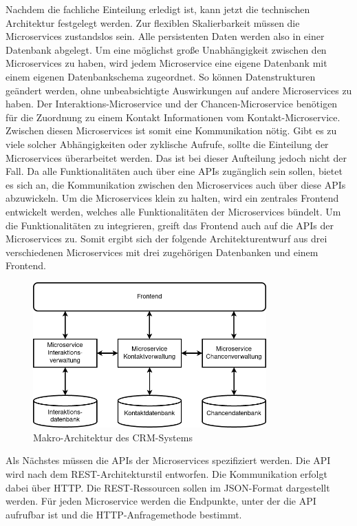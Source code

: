 Nachdem die fachliche Einteilung erledigt ist, kann jetzt die technischen Architektur festgelegt werden. Zur flexiblen Skalierbarkeit müssen die Microservices zustandslos sein. Alle persistenten Daten werden also in einer Datenbank abgelegt. Um eine möglichst große Unabhängigkeit zwischen den Microservices zu haben, wird jedem Microservice eine eigene Datenbank mit einem eigenen Datenbankschema zugeordnet. So können Datenstrukturen geändert werden, ohne unbeabsichtigte Auswirkungen auf andere Microservices zu haben. Der Interaktions-Microservice und der Chancen-Microservice benötigen für die Zuordnung zu einem Kontakt Informationen vom Kontakt-Microservice. Zwischen diesen Microservices ist somit eine Kommunikation nötig. Gibt es zu viele solcher Abhängigkeiten oder zyklische Aufrufe, sollte die Einteilung der Microservices überarbeitet werden. Das ist bei dieser Aufteilung jedoch nicht der Fall. Da alle Funktionalitäten auch über eine \acp{API} zugänglich sein sollen, bietet es sich an, die Kommunikation zwischen den Microservices auch über diese \acp{API} abzuwickeln. Um die Microservices klein zu halten, wird ein zentrales Frontend entwickelt werden, welches alle Funktionalitäten der Microservices bündelt. Um die Funktionalitäten zu integrieren, greift das Frontend auch auf die \acp{API} der Microservices zu. Somit ergibt sich der folgende Architekturentwurf aus drei verschiedenen Microservices mit drei zugehörigen Datenbanken und einem Frontend.

\begin{figure}[H] 
    \centering
    \includegraphics[width=0.8\textwidth]{figures/CRMEntwurf.png}
    \caption{Makro-Architektur des CRM-Systems}
\end{figure}

Als Nächstes müssen die \acp{API} der Microservices spezifiziert werden. Die \ac{API} wird nach dem \ac{REST}-Architekturstil entworfen. Die Kommunikation erfolgt dabei über \ac{HTTP}. Die \ac{REST}-Ressourcen sollen im \ac{JSON}-Format dargestellt werden. Für jeden Microservice werden die Endpunkte, unter der die API aufrufbar ist und die HTTP-Anfragemethode bestimmt.

